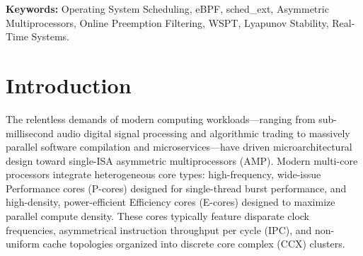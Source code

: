 \documentclass[letterpaper,twocolumn,10pt]{article}
\begin{document}
\begin{abstract}
We evaluate OPTIMA across 16 diverse workloads (pro-audio DSP, high-frequency financial order matching, game physics server, API gateway fan-out, Redis caching, microbenchmarks, IPC ping-pong, and parallel Linux kernel compilation) against CFS/EEVDF, \texttt{scx\_rusty}, and \texttt{scx\_rlfifo}. OPTIMA exhibits a bimodal performance profile: delivering an \textbf{84.1\% reduction in IPC ping-pong latency} (2.55\,$\mu$s vs 16.06\,$\mu$s on CFS) with a \textbf{6.3$\times$ throughput increase} (392,691 ops/s), a \textbf{93.6\% increase in network loopback bandwidth} (111.47 Gbps), \textbf{zero audio underruns}, \textbf{zero game desyncs}, and a \textbf{94.6\% reduction in worst-case real-time latency spikes}. Conversely, on parallel software compilation (\texttt{make kernel/}), OPTIMA takes 6.03s, matching other \texttt{sched\_ext} baselines (5.67s--5.83s) while trailing native in-kernel CFS (3.29s) due to eBPF struct-ops trampoline overhead during fork/exec process storms, and shows moderate throughput regressions (14--30\%) under high-concurrency request multiplexing (Redis, API Gateway). We present an in-depth architectural analysis characterizing these workload trade-offs and identifying the microarchitectural boundaries between specialized eBPF dispatch and in-kernel heuristics.
\end{abstract}

\vspace{1em}
\noindent\textbf{Keywords:} Operating System Scheduling, eBPF, sched\_ext, Asymmetric Multiprocessors, Online Preemption Filtering, WSPT, Lyapunov Stability, Real-Time Systems.
\vspace{1em}

\section{Introduction}
\label{sec:intro}

The relentless demands of modern computing workloads---ranging from sub-millisecond audio digital signal processing and algorithmic trading to massively parallel software compilation and microservices---have driven microarchitectural design toward single-ISA asymmetric multiprocessors (AMP). Modern multi-core processors integrate heterogeneous core types: high-frequency, wide-issue Performance cores (P-cores) designed for single-thread burst performance, and high-density, power-efficient Efficiency cores (E-cores) designed to maximize parallel compute density. These cores typically feature disparate clock frequencies, asymmetrical instruction throughput per cycle (IPC), and non-uniform cache topologies organized into discrete core complex (CCX) clusters.
\end{document}
